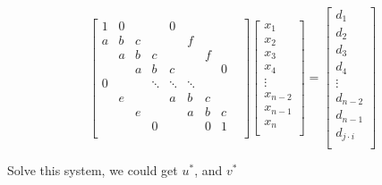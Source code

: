 \documentclass[12pt]{article}
\begin{document}
\[
\begin{bmatrix}
1 & 0 &   &   & 0 &   &    &\\
a & b & c &   &   & f &    &\\
  & a & b & c &   &   & f  &\\
  &   & a & b & c &   &    & 0\\
0 &   &   & \ddots & \ddots & \ddots &  &  \\
  & e &   &   & a & b & c &   &\\
  &   & e &   &   & a & b & c \\
  &   &   & 0 &   &   & 0 & 1 \\
\end{bmatrix}
\begin{bmatrix}
x_1 \\
x_2 \\
x_3 \\
x_4 \\
\vdots \\
x_{n-2} \\
x_{n-1} \\
x_n \\
\end{bmatrix}
=
\begin{bmatrix}
d_1 \\
d_2 \\
d_3 \\
d_4 \\
\vdots \\
d_{n-2} \\
d_{n-1} \\
d_{j\cdot i} \\
\end{bmatrix}
\]


Solve this system, we could get $u^*$, and $v^*$\\






    
\end{document}
